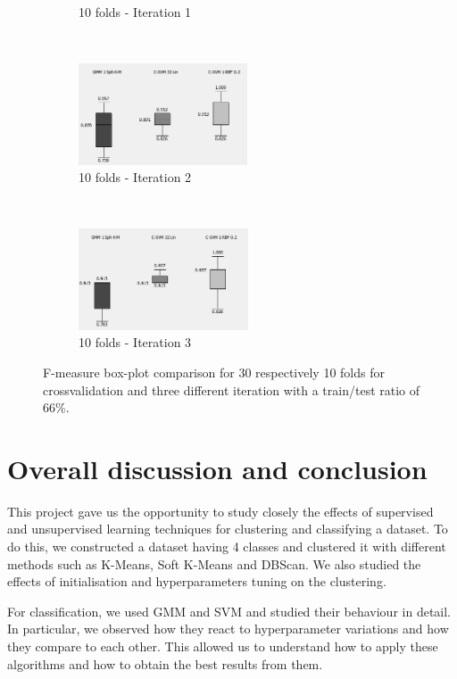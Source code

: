 \documentclass[a4paper,10pt]{article}
\begin{document}
\begin{figure}[H]
\begin{subfigure}[t]{0.3\textwidth}
      \caption{10 folds - Iteration 1}
      \label{fig:10-fold-train-test-ratio-66percent-test-data-A}
     \end{subfigure}
     ~
     \begin{subfigure}[t]{0.3\textwidth}
      \centering
      \includegraphics[height=3cm]{pictures/10-fold-train-test-ratio-66percent-test-data-B}
      \caption{10 folds - Iteration 2}
      \label{fig:10-fold-train-test-ratio-66percent-test-data-B}
     \end{subfigure}
      ~
    \begin{subfigure}[t]{0.3\textwidth}
      \centering
      \includegraphics[height=3cm]{pictures/10-fold-train-test-ratio-66percent-test-data-C}
      \caption{10 folds - Iteration 3}
      \label{fig:10-fold-train-test-ratio-66percent-test-data-C}
     \end{subfigure}
     \caption{F-measure box-plot comparison for 30 respectively 10 folds for crossvalidation and three different iteration with a train/test ratio of 66\%.}
     \label{fig:robustness-fold}
\end{figure}

\section{Overall discussion and conclusion}


This project gave us the opportunity to study closely the effects of supervised and unsupervised learning techniques for clustering and classifying a dataset. To do this, we constructed a dataset having 4 classes and clustered it with different methods such as K-Means, Soft K-Means and DBScan. We also studied the effects of initialisation and hyperparameters tuning on the clustering.

For classification, we used GMM and SVM and studied their behaviour in detail. In particular, we observed how they react to hyperparameter variations and how they compare to each other. This allowed us to understand how to apply these algorithms and how to obtain the best results from them.
\end{document}
